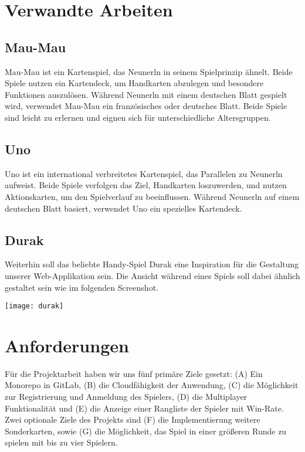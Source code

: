 \documentclass[letterpaper, 10 pt, conference]{IEEEtran}
\begin{document}
\section{Verwandte Arbeiten}

\subsection{Mau-Mau}

Mau-Mau ist ein Kartenspiel, das Neunerln in seinem Spielprinzip ähnelt. Beide Spiele nutzen ein Kartendeck, um Handkarten abzulegen und besondere Funktionen auszulösen. Während Neunerln mit einem deutschen Blatt gespielt wird, verwendet Mau-Mau ein französisches oder deutsches Blatt. Beide Spiele sind leicht zu erlernen und eignen sich für unterschiedliche Altersgruppen.

\subsection{Uno}

Uno ist ein international verbreitetes Kartenspiel, das Parallelen zu Neunerln aufweist. Beide Spiele verfolgen das Ziel, Handkarten loszuwerden, und nutzen Aktionskarten, um den Spielverlauf zu beeinflussen. Während Neunerln auf einem deutschen Blatt basiert, verwendet Uno ein spezielles Kartendeck.

\subsection{Durak}

Weiterhin soll das beliebte Handy-Spiel Durak eine Inspiration für die Gestaltung unserer Web-Applikation sein. Die Ansicht während eines Spiels soll dabei ähnlich gestaltet sein wie im folgenden Screenshot.
\begin{center}
   \texttt{[image: durak]}
\end{center}



\section{Anforderungen}

Für die Projektarbeit haben wir uns fünf primäre Ziele gesetzt: (A) Ein Monorepo in GitLab, (B) die Cloudfähigkeit der Anwendung, (C) die Möglichkeit zur Registrierung und Anmeldung des Spielers, (D) die Multiplayer Funktionalität und (E) die Anzeige einer Rangliste der Spieler mit Win-Rate.
\bigbreak
Zwei optionale Ziele des Projekts sind (F) die Implementierung weitere Sonderkarten, sowie (G) die Möglichkeit, das Spiel in einer größeren Runde zu spielen mit bis zu vier Spielern.
\end{document}
